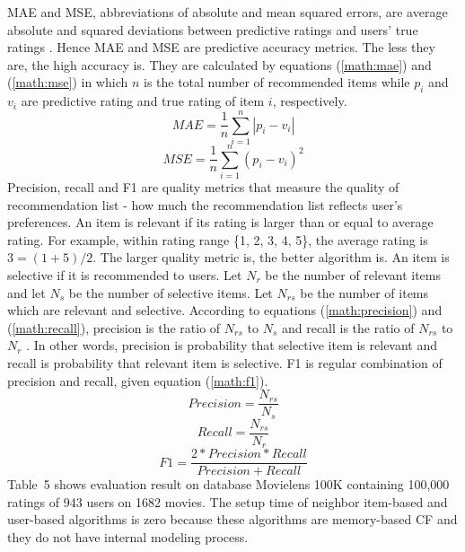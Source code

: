 \documentclass{article}
\begin{document}
MAE and MSE, abbreviations of absolute and mean squared errors, are average absolute and squared deviations between predictive ratings and users' true ratings \cite[pp.~20-21]{herlocker:evaluation}. Hence MAE and MSE are predictive accuracy metrics. The less they are, the high accuracy is. They are calculated by equations (\ref{math:mae}) and (\ref{math:mse}) in which $n$ is the total number of recommended items while $p_i$ and $v_i$ are predictive rating and true rating of item $i$, respectively.
\begin{equation} \label{math:mae}
MAE = \frac{1}{n}\sum_{i=1}^{n}|p_i-v_i|
\end{equation}
\begin{equation} \label{math:mse}
MSE = \frac{1}{n}\sum_{i=1}^{n}(p_i-v_i)^2
\end{equation}
Precision, recall and F1 are quality metrics that measure the quality of recommendation list - how much the recommendation list reflects user's preferences. An item is relevant if its rating is larger than or equal to average rating. For example, within rating range \{1, 2, 3, 4, 5\}, the average rating is $3 = (1 + 5)/2$. The larger quality metric is, the better algorithm is. An item is selective if it is recommended to users. Let $N_r$ be the number of relevant items and let $N_s$ be the number of selective items. Let $N_{rs}$ be the number of items which are relevant and selective. According to equations (\ref{math:precision}) and (\ref{math:recall}), precision is the ratio of $N_{rs}$ to $N_s$ and recall is the ratio of $N_{rs}$ to $N_r$ \cite[p.~23]{herlocker:evaluation}. In other words, precision is probability that selective item is relevant and recall is probability that relevant item is selective. F1 is regular combination of precision and recall, given equation (\ref{math:f1}).
\begin{equation} \label{math:precision}
Precision = \frac{N_{rs}}{N_s}
\end{equation}
\begin{equation} \label{math:recall}
Recall = \frac{N_{rs}}{N_r}
\end{equation}
\begin{equation} \label{math:f1}
F1 = \frac{2*Precision*Recall}{Precision+Recall}
\end{equation}
Table~5 shows evaluation result on database Movielens 100K containing 100,000 ratings of 943 users on 1682 movies. The setup time of neighbor item-based and user-based algorithms is zero because these algorithms are memory-based CF and they do not have internal modeling process.
\end{document}
